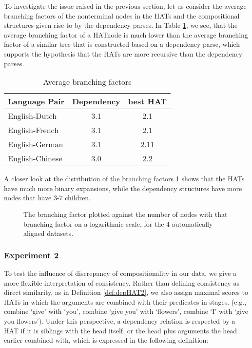 \documentclass[hidelinks]{report}
\begin{document}
To investigate the issue raised in the previous section, let us consider the average branching factors of the nonterminal nodes in the HATs and the compositional structures given rise to by the dependency parses. In Table \ref{tab:branching}, we see, that the average branching factor of a HATnode is much lower than the average branching factor of a similar tree that is constructed based on a dependency parse, which supports the hypothesis that the HATs are more recursive than the dependency parses.

\begin{table}[!ht]
\centering
\begin{tabular}{|l|c|c|}
\hline\textbf{Language Pair} & \textbf{Dependency} &\textbf{best HAT}\\
\hline \hline
English-Dutch & 3.1 & 2.1 \\
\hline
English-French & 3.1 & 2.1 \\
\hline
English-German & 3.1 & 2.11 \\
\hline
English-Chinese & 3.0 & 2.2\\
\hline
\end{tabular}
\caption{Average branching factors}\label{tab:branching}
\end{table}

A closer look at the distribution of the branching factors \ref{fig:branching} shows that the HATs have much more binary expansions, while the dependency structures have more nodes that have 3-7 children.

\begin{figure}[!ht]

\caption{The branching factor plotted against the number of nodes with that branching factor on a logarithmic scale, for the 4 automatically aligned datasets.}\label{fig:branching}
\end{figure}


\subsubsection{Experiment 2}

To test the influence of discrepancy of compositionality in our data, we give a more flexible interpretation of consistency. Rather than defining consistency as direct similarity, as in Definition \ref{def:depHAT2}, we also assign maximal scores to HATs in which the arguments are combined with their predicates in stages. (e.g., combine `give' with `you', combine `give you' with `flowers', combine `I' with `give you flowers'). Under this perspective, a dependency relation is respected by a HAT if it is siblings with the head itself, or the head plus arguments the head earlier combined with, which is expressed in the following definition:
\end{document}
